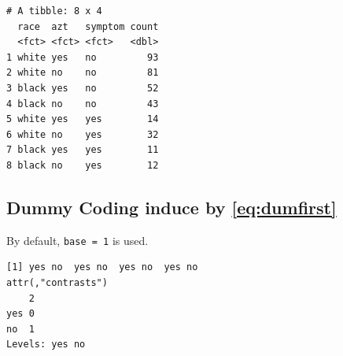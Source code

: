 \documentclass[]{book}
\newenvironment{Shaded}{\begin{snugshade}}{\end{snugshade}}
\newcommand{\CommentTok}[1]{\textcolor[rgb]{0.56,0.35,0.01}{\textit{#1}}}
\newcommand{\ControlFlowTok}[1]{\textcolor[rgb]{0.13,0.29,0.53}{\textbf{#1}}}
\newcommand{\DataTypeTok}[1]{\textcolor[rgb]{0.13,0.29,0.53}{#1}}
\newcommand{\DecValTok}[1]{\textcolor[rgb]{0.00,0.00,0.81}{#1}}
\newcommand{\KeywordTok}[1]{\textcolor[rgb]{0.13,0.29,0.53}{\textbf{#1}}}
\newcommand{\NormalTok}[1]{#1}
\newcommand{\OperatorTok}[1]{\textcolor[rgb]{0.81,0.36,0.00}{\textbf{#1}}}
\newcommand{\OtherTok}[1]{\textcolor[rgb]{0.56,0.35,0.01}{#1}}
\newcommand{\StringTok}[1]{\textcolor[rgb]{0.31,0.60,0.02}{#1}}
\begin{document}
\begin{Shaded}
\end{Shaded}

\begin{verbatim}
# A tibble: 8 x 4
  race  azt   symptom count
  <fct> <fct> <fct>   <dbl>
1 white yes   no         93
2 white no    no         81
3 black yes   no         52
4 black no    no         43
5 white yes   yes        14
6 white no    yes        32
7 black yes   yes        11
8 black no    yes        12
\end{verbatim}

\hypertarget{dummy-coding-induce-by}{%
\subsection{\texorpdfstring{Dummy Coding induce by \eqref{eq:dumfirst}}{Dummy Coding induce by }}\label{dummy-coding-induce-by}}

By default, \texttt{base\ =\ 1} is used.

\begin{Shaded}
\end{Shaded}

\begin{verbatim}
[1] yes no  yes no  yes no  yes no 
attr(,"contrasts")
    2
yes 0
no  1
Levels: yes no
\end{verbatim}

\begin{Shaded}
\end{Shaded}
\end{document}
